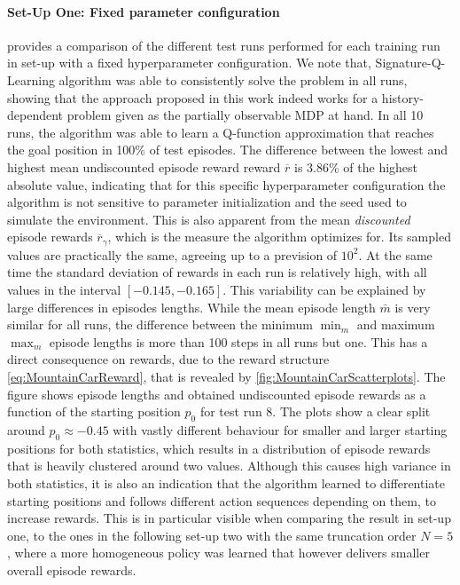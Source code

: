\documentclass[
    a4paper,
    11pt,
    bibliography=totoc,
    listof=totoc,      
    headinclude=true,
    cleardoublepage=empty,
]{scrbook}
\theoremstyle{plain}
\theoremstyle{definition}
\theoremstyle{remark}
\begin{document}
\paragraph{Set-Up One: Fixed parameter configuration}
\label{chapter:Experiments:section:MountainCar:sub:Results:par:SetUpOne}

 provides a comparison of the different
test runs performed for each training run in set-up with a fixed hyperparameter configuration. We note that, Signature-Q-Learning algorithm
was able to consistently solve the problem in all runs, showing that the
approach proposed in this work indeed works for a history-dependent problem
given as the partially observable MDP at hand. In all 10 runs, the 
algorithm was able to
learn a Q-function approximation that reaches the goal position in 100\% of
test episodes. The difference between the lowest and highest mean undiscounted 
episode reward reward $\overline r$ is 3.86\% of the highest absolute value, 
indicating that for this specific hyperparameter configuration the algorithm is 
not sensitive to parameter initialization and the seed used to simulate the 
environment. This is also apparent from the mean \textit{discounted} episode 
rewards $\overline r_\gamma$, which is the measure the algorithm optimizes for. 
Its sampled values are practically the same, agreeing up to a prevision of 
$10^{2}$. At the same time the standard deviation of rewards in each run is 
relatively high, with all values in the interval $[-0.145, -0.165]$. This
variability can be explained by large differences in episodes lengths. While
the mean episode length $\bar{m}$ is very similar for all runs, the
difference between the minimum $\min_m$ and maximum $\max_m$ episode lengths is 
more than 100 steps in all runs but one. This has a direct consequence on
rewards, due to the reward structure \eqref{eq:MountainCarReward}, that is 
revealed by \cref{fig:MountainCarScatterplots}. The figure shows episode 
lengths and obtained undiscounted episode rewards as a function of the starting 
position $p_0$ for test run 8. The plots show a clear split around 
$p_0\approx -0.45$ with vastly different behaviour for smaller and larger
starting positions for both statistics, which results in a distribution of 
episode rewards that is heavily clustered around two values.
Although this causes high variance in both statistics, it is also an indication that the algorithm learned to
differentiate starting positions and follows different action sequences
depending on them, to increase rewards. This is in particular visible when
comparing the result in set-up one, to the ones in the following set-up two
with the same truncation order $N=5$, where a more homogeneous policy was
learned that however delivers smaller overall episode rewards.
\end{document}
